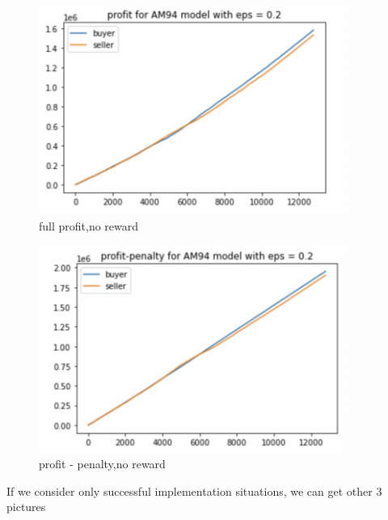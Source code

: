 \documentclass[11pt]{article}
\begin{document}
\begin{figure}[H]
	\begin{center}
	\includegraphics[width=0.9\textwidth]{32.PNG}
	\end{center}
	\caption{full profit,no reward}
	\label{FIG.32}
\end{figure}

\begin{figure}[H]
	\begin{center}
	\includegraphics[width=0.9\textwidth]{33.PNG}
	\end{center}
	\caption{profit - penalty,no reward}
	\label{FIG.33}
\end{figure}	

If we consider only successful implementation situations, we can get other 3 pictures
\end{document}
